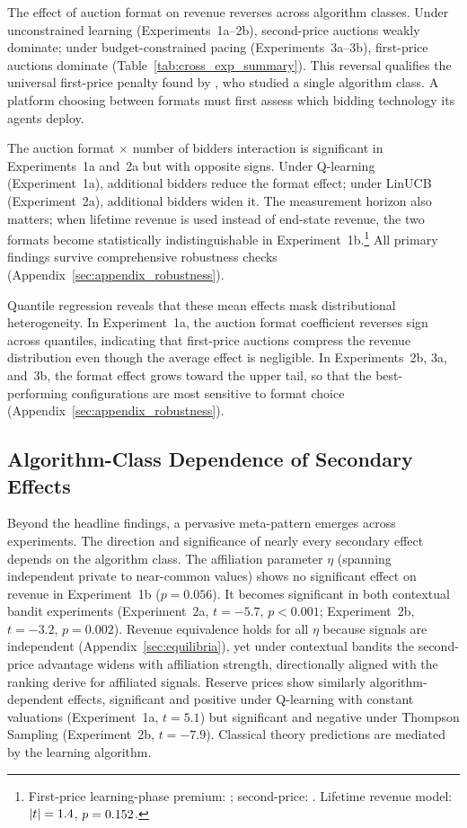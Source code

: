 The effect of auction format on revenue reverses across algorithm classes. Under unconstrained learning (Experiments~1a--2b), second-price auctions weakly dominate; under budget-constrained pacing (Experiments~3a--3b), first-price auctions dominate (Table~\ref{tab:cross_exp_summary}). This reversal qualifies the universal first-price penalty found by \citet{BanchioSkrzypacz2022}, who studied a single algorithm class. A platform choosing between formats must first assess which bidding technology its agents deploy.

The auction format $\times$ number of bidders interaction is significant in Experiments~1a and~2a but with opposite signs. Under Q-learning (Experiment~1a), additional bidders reduce the format effect; under LinUCB (Experiment~2a), additional bidders widen it. The measurement horizon also matters; when lifetime revenue is used instead of end-state revenue, the two formats become statistically indistinguishable in Experiment~1b.\footnote{First-price learning-phase premium: \ExpOneBFPAPremium; second-price: \ExpOneBSPAPremium. Lifetime revenue model: $|t| = 1.4$, $p = 0.152$.} All primary findings survive comprehensive robustness checks (Appendix~\ref{sec:appendix_robustness}).

Quantile regression reveals that these mean effects mask distributional heterogeneity. In Experiment~1a, the auction format coefficient reverses sign across quantiles, indicating that first-price auctions compress the revenue distribution even though the average effect is negligible. In Experiments~2b, 3a, and~3b, the format effect grows toward the upper tail, so that the best-performing configurations are most sensitive to format choice (Appendix~\ref{sec:appendix_robustness}).

\subsection{Algorithm-Class Dependence of Secondary Effects}

Beyond the headline findings, a pervasive meta-pattern emerges across experiments. The direction and significance of nearly every secondary effect depends on the algorithm class. The affiliation parameter $\eta$ (spanning independent private to near-common values) shows no significant effect on revenue in Experiment~1b ($p = 0.056$). It becomes significant in both contextual bandit experiments (Experiment~2a, $t = -5.7$, $p < 0.001$; Experiment~2b, $t = -3.2$, $p = 0.002$). Revenue equivalence holds for all $\eta$ because signals are independent (Appendix~\ref{sec:equilibria}), yet under contextual bandits the second-price advantage widens with affiliation strength, directionally aligned with the ranking \citet{MilgromWeber1982} derive for affiliated signals. Reserve prices show similarly algorithm-dependent effects, significant and positive under Q-learning with constant valuations (Experiment~1a, $t = 5.1$) but significant and negative under Thompson Sampling (Experiment~2b, $t = -7.9$). Classical theory predictions are mediated by the learning algorithm.

